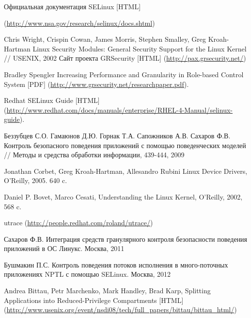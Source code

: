 \begin{thebibliography}{99}
Официальная документация SELinux [HTML] 

(\url{http://www.nsa.gov/research/selinux/docs.shtml})

Chris Wright, Crispin Cowan, James Morris, Stephen Smalley, Greg
Kroah-Hartman
Linux Security Modules: General Security Support for the Linux Kernel 
// USENIX, 2002
Сайт проекта GRSecurity [HTML] 
(\url{http://pax.grsecurity.net/})

Bradley Spengler Increasing Performance and Granularity
in Role-based Control System [PDF]
(\url{http://www.grsecurity.net/researchpaper.pdf}).

 Redhat SELinux Guide [HTML]
 (\url{http://www.redhat.com/docs/manuals/enterprise/RHEL-4-Manual/selinux-guide}).

Беззубцев С.О. Гамаюнов Д.Ю. Горнак Т.А. Сапожников А.В.
Сахаров Ф.В. Контроль безопасного поведения приложений
с помощью поведенческих моделей // Методы и средства обработки информации, 439-444, 2009

Jonathan Corbet, Greg Kroah-Hartman, Allesandro Rubini Linux Device Drivers, O'Reilly, 2005. 640 c.

Daniel P. Bovet, Marco Cesati, Understanding the Linux Kernel, O'Reilly, 2002, 568 c.
 
utrace
(\url{http://people.redhat.com/roland/utrace/})

Сахаров Ф.В. Интеграция средств гранулярного контроля безопасности
поведения приложений в ОС Линукс. Москва, 2011

Бушмакин П.С. Контроль поведения потоков исполнения в много-поточных
приложениях NPTL с помощью SELinux. Москва, 2012


Andrea Bittau, Petr Marchenko, Mark Handley, Brad Karp,
Splitting Applications into Reduced-Privilege Compartments [HTML]
(\url{http://www.usenix.org/event/nsdi08/tech/full\_papers/bittau/bittau\_html/}) 

\end{thebibliography}
